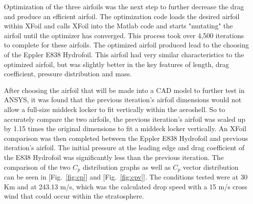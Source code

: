 \begin{table}[H]
\caption{\label{tab:xfoilanalysis}XFoil 2D analysis.}
\centering
{}
\end{table}

Optimization of the three airfoils was the next step to further decrease the drag and produce an efficient airfoil. The optimization code loads the desired airfoil within XFoil and calls XFoil into the Matlab code and starts "mutating" the airfoil until the optimizer has converged. This process took over 4,500 iterations to complete for these airfoils.  The optimized airfoil produced lead to the choosing of the Eppler E838 Hydrofoil. This airfoil had very similar characteristics to the optimized airfoil, but was slightly better in the key features of length, drag coefficient, pressure distribution and mass.

After choosing the airfoil that will be made into a CAD model to further test in ANSYS, it was found that the previous iteration's airfoil dimensions would not allow a full-size middeck locker to fit vertically within the aeroshell. So to accurately compare the two airfoils, the previous iteration's airfoil was scaled up by 1.15 times the original dimensions to fit a middeck locker vertically. An XFoil comparison was then completed between the Eppler E838 Hydrofoil and previous iteration's airfoil. The initial pressure at the leading edge and drag coefficient of the E838 Hydrofoil was significantly less than the previous iteration. The comparison of the two $C_p$ distribution graphs as well as $C_p$ vector distribution can be seen in [Fig.~\ref{fig:cp}] and [Fig.~\ref{fig:cpv}]. The conditions tested were at 30 Km and at 243.13 m/s, which was the calculated drop speed with a 15 m/s cross wind that could occur within the stratosphere.

